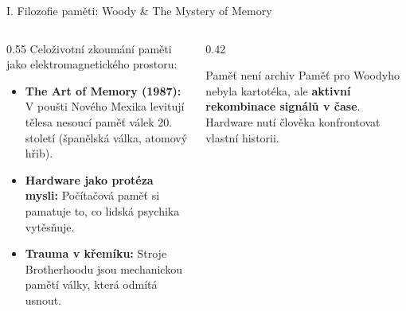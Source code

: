 \documentclass[aspectratio=169,11pt]{beamer}
\begin{document}
\begin{frame}{I. Filozofie paměti: Woody \& The Mystery of Memory}
  \begin{columns}
    \begin{column}{0.55\textwidth}
      Celoživotní zkoumání paměti jako elektromagnetického prostoru:
      \begin{itemize}
        \item \textbf{The Art of Memory (1987):} V poušti Nového Mexika levitují tělesa nesoucí paměť válek 20. století (španělská válka, atomový hřib).
        \item \textbf{Hardware jako protéza mysli:} Počítačová paměť si pamatuje to, co lidská psychika vytěsňuje.
        \item \textbf{Trauma v křemíku:} Stroje Brotherhoodu jsou mechanickou pamětí války, která odmítá usnout.
      \end{itemize}
    \end{column}
    \begin{column}{0.42\textwidth}
      \begin{block}{Paměť není archiv}
        Paměť pro Woodyho nebyla kartotéka, ale \textbf{aktivní rekombinace signálů v čase}. Hardware nutí člověka konfrontovat vlastní historii.
      \end{block}
    \end{column}
  \end{columns}
\end{frame}
\end{document}
